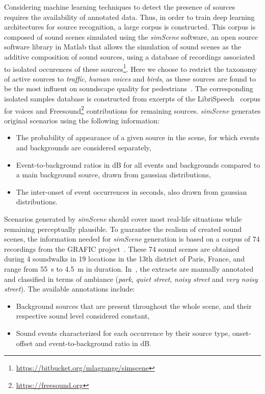 \documentclass[twocolumn]{article}
\begin{document}
Considering machine learning techniques to detect the presence of sources requires the availability of annotated data. Thus, in order to train deep learning architectures for source recognition, a large corpus is constructed. This corpus is composed of sound scenes simulated using the \textit{simScene} software, an open source software library in Matlab that allows the simulation of sound scenes as the additive composition of sound sources, using a database of recordings associated to isolated occurences of these sources\footnote{\url{https://bitbucket.org/mlagrange/simscene}}. Here we choose to restrict the taxonomy of active sources to \textit{traffic}, \textit{human voices} and \textit{birds}, as these sources are found to be the most influent on soundscape quality for pedestrians~\cite{lavandier2006}. The corresponding isolated samples database is constructed from excerpts of the LibriSpeech~\cite{panayotov2015} corpus for voices and Freesound\footnote{\url{https://freesound.org}} contributions for remaining sources. \textit{simScene} generates original scenarios using the following information:

\begin{itemize}
\item The probability of appearance of a given source in the scene, for which events and backgrounds are considered separately,
\item Event-to-background ratios in dB for all events and backgrounds compared to a main background source, drawn from gaussian distributions,
\item The inter-onset of event occurrences in seconds, also drawn from gaussian distributions.
\end{itemize}

Scenarios generated by \textit{simScene} should cover most real-life situations while remaining perceptually plausible. To guarantee the realism of created sound scenes, the information needed for \textit{simScene} generation is based on a corpus of 74 recordings from the GRAFIC project~\cite{aumond2017}. These 74 sound scenes are obtained during 4 soundwalks in 19 locations in the 13th district of Paris, France, and range from 55~s to 4.5~m in duration. In~\cite{gloaguen2017}, the extracts are manually annotated and classified in terms of ambiance (\textit{park}, \textit{quiet street}, \textit{noisy street} and \textit{very noisy street}). The available annotations include:

\begin{itemize}
\item Background sources that are present throughout the whole scene, and their respective sound level considered constant,
\item Sound events characterized for each occurrence by their source type, onset-offset and event-to-background ratio in dB.
\end{itemize}
\end{document}
